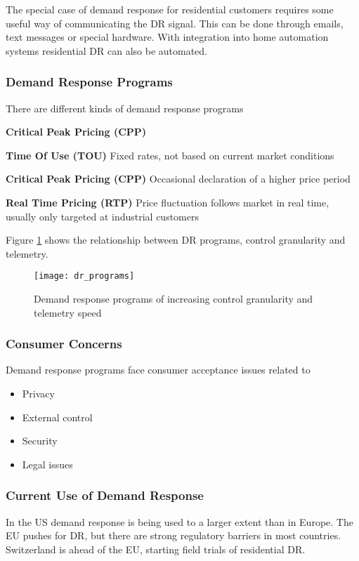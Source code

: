 The special case of demand response for residential customers requires some useful way of communicating the DR signal.
This can be done through emails, text messages or special hardware.
With integration into home automation systems residential DR can also be automated.

\subsubsection{Demand Response Programs}
There are different kinds of demand response programs

\begin{labeling}{\textbf{Critical Peak Pricing (CPP)}}
    \item [\textbf{Time Of Use (TOU)}]
    Fixed rates, not based on current market conditions

    \item [\textbf{Critical Peak Pricing (CPP)}]
    Occasional declaration of a higher price period

    \item [\textbf{Real Time Pricing (RTP)}]
    Price fluctuation follows market in real time, usually only targeted at industrial customers

\end{labeling}

Figure \ref{fig:dr_programs} shows the relationship between DR programs, control granularity and telemetry.

\begin{figure}
    \centering
    \texttt{[image: dr\_programs]}
    \caption{Demand response programs of increasing control granularity and telemetry speed}
    \label{fig:dr_programs}
\end{figure}

\subsubsection{Consumer Concerns}
Demand response programs face consumer acceptance issues related to
\begin{itemize}
    \item Privacy
    \item External control
    \item Security
    \item Legal issues
\end{itemize}

\subsubsection{Current Use of Demand Response}
In the US demand response is being used to a larger extent than in Europe.
The EU pushes for DR, but there are strong regulatory barriers in most countries.
Switzerland is ahead of the EU, starting field trials of residential DR.
